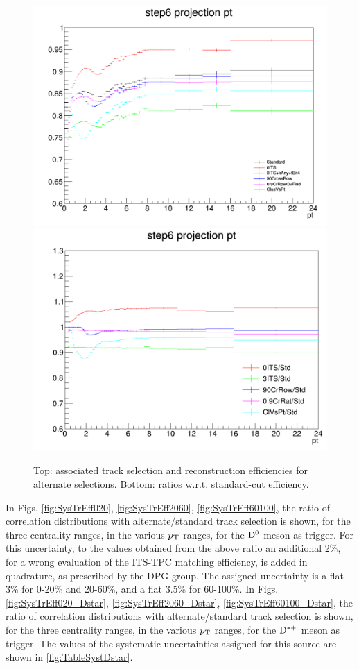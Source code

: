 \begin{figure}
\centering
{\includegraphics[width=0.75\linewidth]{figuresVsCent/Dzero/SystTrackEff/AltTrackEff.png}}
{\includegraphics[width=0.75\linewidth]{figuresVsCent/Dzero/SystTrackEff/AltTrackEffRatios.png}}
\caption{Top: associated track selection and reconstruction efficiencies for alternate selections. Bottom: ratios w.r.t. standard-cut efficiency.}
\label{fig:TrEffVariations}
\end{figure}

In Figs. \ref{fig:SysTrEff020}, \ref{fig:SysTrEff2060}, \ref{fig:SysTrEff60100}, the ratio of correlation distributions with alternate/standard track selection is shown, for the three centrality ranges, in the various $p_{\rm T}$ ranges, for the ${\rm D^0}$ meson as trigger.
For this uncertainty, to the values obtained from the above ratio an additional 2\%, for a wrong evaluation of the ITS-TPC matching efficiency, is added in quadrature, as prescribed by the DPG group.
The assigned uncertainty is a flat 3\% for 0-20\% and 20-60\%, and a flat 3.5\% for 60-100\%.
In Figs. \ref{fig:SysTrEff020_Dstar}, \ref{fig:SysTrEff2060_Dstar}, \ref{fig:SysTrEff60100_Dstar}, the ratio of correlation distributions with alternate/standard track selection is shown, for the three centrality ranges, in the various $p_{\rm T}$ ranges, for the ${\rm D^{*+}}$ meson as trigger. The values of the systematic uncertainties assigned for this source are shown in \ref{fig:TableSystDstar}.

